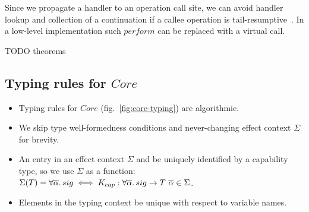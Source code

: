 \documentclass[acmsmall]{acmart}
\newcommand{\ap}{~}
\begin{document}
Since we propagate a handler to an operation call site, we can avoid handler lookup and collection of a continuation if a callee operation is tail-resumptive~\cite{xie2020effect}.
In a low-level implementation such $perform$ can be replaced with a virtual call. %

TODO theorems %

\subsection{Typing rules for $Core$}

\begin{itemize}
    \item Typing rules for $Core$ (fig.\ \ref{fig:core-typing}) are algorithmic.
    \item We skip type well-formedness conditions and never-changing effect context $\Sigma$ for brevity.
    \item An entry in an effect context $\Sigma$ and be uniquely identified by a capability type, so we use $\Sigma$ as a function: $\Sigma(T) = \forall\overline{\alpha}\ldotp sig \iff K_{cap} : \forall\overline{\alpha}\ldotp sig\to T\ap\overline{\alpha}\in\Sigma$.
    \item Elements in the typing context be unique with respect to variable names.
\end{itemize}
\end{document}
